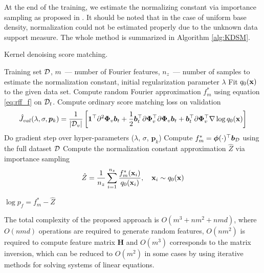 At the end of the training, we estimate the normalizing constant via importance sampling
as proposed in \cite{GrettonDeep}.
It should be noted that in the case of uniform base density, normalization could not be
estimated properly due to the unknown data support measure.
The whole method is summarized in Algorithm \ref{alg:KDSM}.
\begin{algorithm}
\caption{Kernel denoising score matching.}
\label{alg:KDSM}
\begin{algorithmic}[1]
    \Require Training set ${\cal D}$, $m$~--- number of Fourier features,
    $n_z$~--- number of samples to estimate the normalization constant,
    initial regularization parameter $\lambda$
    \State Fit $q_0({\bf x})$ to the given data set.
            \State Compute random Fourier approximation $f_m^*$ using equation \eqref{eq:rff_f} on ${\cal D}_t$.
            \State Compute ordinary score matching loss on validation
            \[
                \hat{J}_{val}(\lambda, \sigma, {\bm p}_k) =
                \frac{1}{|{\cal D}_v|}\left[
                    {\bf 1}^{\top}\partial^2 \bm{\Phi}_{v}\bm{b}_t +
                    \frac{1}{2}\bm{b}_t^{\top}\partial \bm{\Phi}_{v}^{\top}
                    \partial \bm{\Phi}_{v}\bm{b}_t +
                    \bm{b}_t^{\top}\partial \bm{\Phi}_{v}^{\top} \nabla\log q_0({\bf x})
                \right]
            \]
            \State Do gradient step over hyper-parameters ($\lambda$, $\sigma$, ${\bm p}_k$)
        \EndFor
    \EndWhile
    \State Compute $f_m^* = \bm{\phi}(\cdot)^{\top}\bm{b}_{\cal D}$
    using the full dataset ${\cal D}$
    \State Compute the normalization constant approximation $\hat{Z}$ via importance sampling
    \[
        \hat{Z} = \frac{1}{n_z}\sum_{i = 1}^{n_z}\frac{f_m^*({\bf x}_i)}{q_0({\bf x}_i)},
        \quad {\bf x}_i \sim q_0({\bf x})
    \]
\end{algorithmic}
\Return $\log p_f = f_m^* - \hat{Z}$
\end{algorithm}


The total complexity of the proposed approach is $O(m^3 + nm^2 + nmd)$,
where $O(nmd)$ operations are required to generate random features,
$O(nm^2)$ is required to compute feature matrix ${\bm H}$
and $O(m^3)$ corresponds to the matrix inversion, which can be reduced to
$O(m^2)$ in some cases by using iterative methods for solving systems of linear equations.

